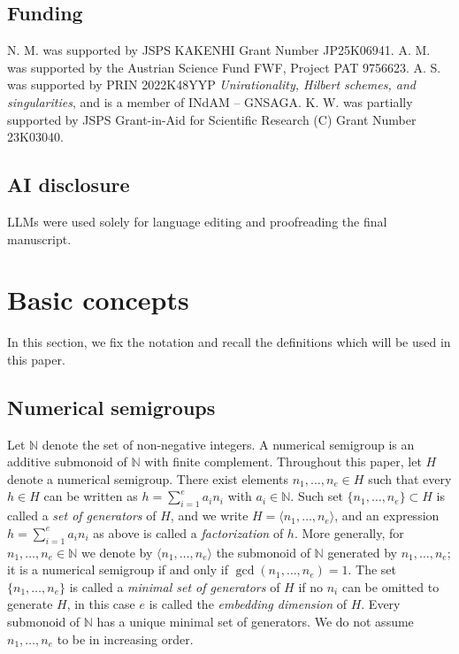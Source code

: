 \documentclass[11pt,twoside]{amsart}
\newcommand{\N}{\mathbb N}
\theoremstyle{definition}
\numberwithin{equation}{section}
\begin{document}
\subsection*{Funding}
N. M. was supported by JSPS KAKENHI Grant Number JP25K06941.
A. M. was supported by the Austrian Science Fund FWF, Project PAT 9756623.
A. S.  was  supported by 
PRIN 2022K48YYP \emph{Unirationality, Hilbert schemes, and singularities},
and is a member of  INdAM – GNSAGA.
K. W.  was partially supported by JSPS Grant-in-Aid 
for Scientific Research (C) Grant Number 23K03040.

\subsection*{AI disclosure}
LLMs were used solely for language editing and proofreading the final manuscript.





\section{Basic concepts}\label{SectionBasicConcepts}


In this section, we fix the notation and recall the 
 definitions  which will be used in this paper.

\subsection{Numerical semigroups}\label{SubsectionNumericalSemigroups}
Let $\N$ denote the set of non-negative integers.
A numerical semigroup is an additive submonoid of $\N$ with finite complement.
Throughout this paper, let $H$ denote a numerical semigroup.
There exist elements  $n_1,\ldots,n_e\in H$ such that every $h\in H$ can be written as $h=\sum_{i=1}^e a_in_i$ with  $a_i \in \N$. 
Such set   $\{n_1,\ldots,n_e\}\subset H$ is called a {\em set of generators} of $H$, and we  write $H=\langle n_1,\ldots ,n_e\rangle$,
and an expression $h=\sum_{i=1}^e a_in_i$ as above  is called a {\em factorization} of $h$.
More generally, for $n_1,\ldots,n_e\in \N$ we denote by $\langle n_1,\ldots ,n_e\rangle$ the submonoid of $\N$ generated by $n_1,\ldots,n_e$;
it is a numerical semigroup if and only if $\gcd(n_1,\ldots,n_e)=1$.
The set 
$\{n_1,\ldots,n_e\}$ is called a {\em minimal set of generators} of $H$ if no $n_i$ can be omitted to generate $H$,
in this case $e$ is called the {\em embedding dimension} of $H$.
Every submonoid of $\N$ has a unique
 minimal set of generators.
We  do not assume $n_1, \ldots, n_e $ to be in increasing order.
\end{document}
